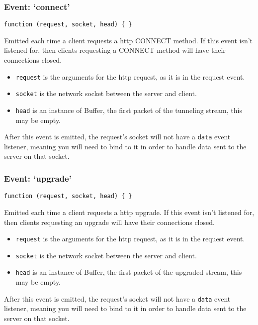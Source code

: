 \subsubsection{Event: `connect'}

\texttt{function (request, socket, head) \{ \}}

Emitted each time a client requests a http CONNECT method. If this event
isn't listened for, then clients requesting a CONNECT method will have
their connections closed.

\begin{itemize}
\item
  \texttt{request} is the arguments for the http request, as it is in
  the request event.
\item
  \texttt{socket} is the network socket between the server and client.
\item
  \texttt{head} is an instance of Buffer, the first packet of the
  tunneling stream, this may be empty.
\end{itemize}

After this event is emitted, the request's socket will not have a
\texttt{data} event listener, meaning you will need to bind to it in
order to handle data sent to the server on that socket.

\subsubsection{Event: `upgrade'}

\texttt{function (request, socket, head) \{ \}}

Emitted each time a client requests a http upgrade. If this event isn't
listened for, then clients requesting an upgrade will have their
connections closed.

\begin{itemize}
\item
  \texttt{request} is the arguments for the http request, as it is in
  the request event.
\item
  \texttt{socket} is the network socket between the server and client.
\item
  \texttt{head} is an instance of Buffer, the first packet of the
  upgraded stream, this may be empty.
\end{itemize}

After this event is emitted, the request's socket will not have a
\texttt{data} event listener, meaning you will need to bind to it in
order to handle data sent to the server on that socket.


